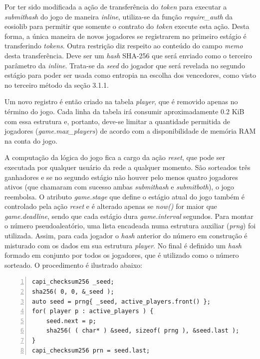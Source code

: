 \documentclass[a4paper,12pt]{monografia}
\theoremstyle{plain}
\theoremstyle{definition}
\theoremstyle{remark}
\begin{document}
Por ter sido modificada a a\c{c}\~ao de transfer\^encia do \textit{token} para executar a \textit{submithash} do jogo de maneira \textit{inline}, utiliza-se da fun\c{c}\~ao \textit{require\_auth} da eosiolib para permitir que somente o contrato do \textit{token} execute esta a\c{c}\~ao.
Desta forma, a \'unica maneira de novos jogadores se registrarem no primeiro est\'agio \'e transferindo \textit{tokens}.
Outra restri\c{c}\~ao diz respeito ao conte\'udo do campo \textit{memo} desta transfer\^encia.
Deve ser um \textit{hash} SHA-256 que ser\'a enviado como o terceiro par\^ametro da \textit{inline}.
Trata-se da \textit{seed} do jogador que ser\'a revelada no segundo est\'agio para poder ser usada como entropia na escolha dos vencedores, como visto no terceiro m\'etodo da se\c{c}\~ao 3.1.1.

Um novo registro \'e ent\~ao criado na tabela \textit{player}, que \'e removido apenas no t\'ermino do jogo.
Cada linha da tabela ir\'a consumir aproximadamente 0.2 KiB com essa estrutura e, portanto, deve-se limitar a quantidade permitida de jogadores (\textit{game.max\_players}) de acordo com a disponibilidade de mem\'oria RAM na conta do jogo.

A computa\c{c}\~ao da l\'ogica do jogo fica a cargo da a\c{c}\~ao \textit{reset}, que pode ser executada por qualquer usu\'ario da rede a qualquer momento.
S\~ao sorteados tr\^es ganhadores e se no segundo est\'agio n\~ao houver pelo menos quatro jogadores ativos (que chamaram com sucesso ambas \textit{submithash} e \textit{submitboth}), o jogo reembolsa.
O atributo \textit{game.stage} que define o est\'agio atual do jogo tamb\'em \'e controlado pela a\c{c}\~ao \textit{reset} e \'e alterado apenas se \textit{now()} for maior que \textit{game.deadline}, sendo que cada est\'agio dura \textit{game.interval} segundos.
Para montar o n\'umero pseudoaleat\'orio, uma lista encadeada numa estrutura auxiliar (\textit{prng}) foi utilizada.
Assim, para cada jogador o \textit{hash} anterior do n\'umero em constru\c{c}\~ao \'e misturado com os dados em sua estrutura \textit{player}.
No final \'e definido um \textit{hash} formado em conjunto por todos os jogadores, que \'e utilizado como o n\'umero sorteado.
O procedimento \'e ilustrado abaixo:

\lstset{tabsize=5,language=C++,showstringspaces=false,basicstyle=\ttfamily\small,keywordstyle=\bf,breaklines=true}
\begin{singlespacing}
\begin{lstlisting}[frame=single,framexrightmargin=1pt,numbers=left]
capi_checksum256 _seed;
sha256( 0, 0, &_seed );
auto seed = prng{ _seed, active_players.front() };
for( player p : active_players ) {
    seed.next = p;
    sha256( ( char* ) &seed, sizeof( prng ), &seed.last );
}
capi_checksum256 prn = seed.last;
\end{lstlisting}
\end{singlespacing}
\end{document}
